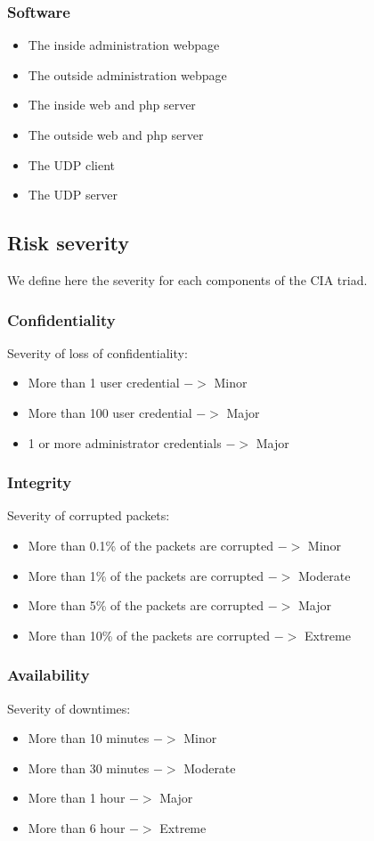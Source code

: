 \documentclass[a4paper,11pt]{article}
\begin{document}
\subsubsection{Software}
\begin{itemize}
\item The inside administration webpage
\item The outside administration webpage
\item The inside web and php server
\item The outside web and php server
\item The UDP client
\item The UDP server
\end{itemize}
\subsection{Risk severity}
We define here the severity for each components of the CIA triad.
\subsubsection{Confidentiality}
Severity of loss of confidentiality:
\begin{itemize}
\item More than 1 user credential $->$ Minor
\item More than 100 user credential $->$ Major
\item 1 or more administrator credentials $ ->$ Major

\end{itemize}
\subsubsection{Integrity}
Severity of corrupted packets:
\begin{itemize}
\item More than 0.1\% of the packets are corrupted $->$ Minor
\item More than 1\% of the packets are corrupted $->$ Moderate
\item More than 5\% of the packets are corrupted $->$ Major
\item More than 10\% of the packets are corrupted $->$ Extreme
\end{itemize}
\subsubsection{Availability}
Severity of downtimes:
\begin{itemize}
\item More than 10 minutes $->$ Minor
\item More than 30 minutes $->$ Moderate
\item More than 1 hour $->$ Major
\item More than 6 hour $->$ Extreme
\end{itemize}
\end{document}
